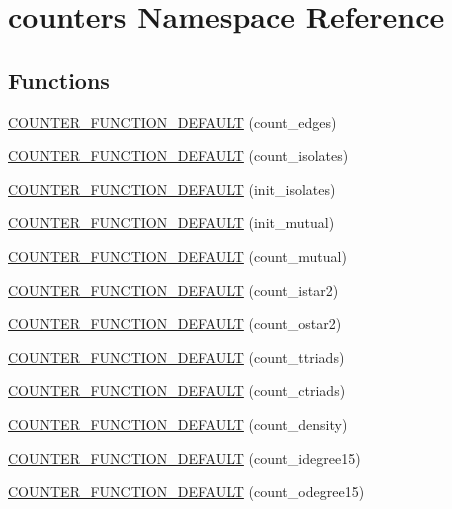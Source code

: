 \hypertarget{namespacecounters}{}\section{counters Namespace Reference}
\label{namespacecounters}
\subsection*{Functions}
\begin{DoxyCompactItemize}
\item 
\hyperlink{namespacecounters_a7e3248247de2a17aac2b02b27f78fa11}{C\+O\+U\+N\+T\+E\+R\+\_\+\+F\+U\+N\+C\+T\+I\+O\+N\+\_\+\+D\+E\+F\+A\+U\+LT} (count\+\_\+edges)
\item 
\hyperlink{namespacecounters_a2bb698ff1178ee5dc760fd9597269ae2}{C\+O\+U\+N\+T\+E\+R\+\_\+\+F\+U\+N\+C\+T\+I\+O\+N\+\_\+\+D\+E\+F\+A\+U\+LT} (count\+\_\+isolates)
\item 
\hyperlink{namespacecounters_a5bbb4b20239df8359834a0bf531045bc}{C\+O\+U\+N\+T\+E\+R\+\_\+\+F\+U\+N\+C\+T\+I\+O\+N\+\_\+\+D\+E\+F\+A\+U\+LT} (init\+\_\+isolates)
\item 
\hyperlink{namespacecounters_a42e9a8748d506b7e8b422c69aa262c2e}{C\+O\+U\+N\+T\+E\+R\+\_\+\+F\+U\+N\+C\+T\+I\+O\+N\+\_\+\+D\+E\+F\+A\+U\+LT} (init\+\_\+mutual)
\item 
\hyperlink{namespacecounters_a7a3094fba5a8576a717e92a223382fa0}{C\+O\+U\+N\+T\+E\+R\+\_\+\+F\+U\+N\+C\+T\+I\+O\+N\+\_\+\+D\+E\+F\+A\+U\+LT} (count\+\_\+mutual)
\item 
\hyperlink{namespacecounters_a1033c77fee688a3604a92e462b0655d0}{C\+O\+U\+N\+T\+E\+R\+\_\+\+F\+U\+N\+C\+T\+I\+O\+N\+\_\+\+D\+E\+F\+A\+U\+LT} (count\+\_\+istar2)
\item 
\hyperlink{namespacecounters_a0a4b15f371d634c31f5d6cdaef01ed69}{C\+O\+U\+N\+T\+E\+R\+\_\+\+F\+U\+N\+C\+T\+I\+O\+N\+\_\+\+D\+E\+F\+A\+U\+LT} (count\+\_\+ostar2)
\item 
\hyperlink{namespacecounters_a367e00a607897c087789480960ded810}{C\+O\+U\+N\+T\+E\+R\+\_\+\+F\+U\+N\+C\+T\+I\+O\+N\+\_\+\+D\+E\+F\+A\+U\+LT} (count\+\_\+ttriads)
\item 
\hyperlink{namespacecounters_abd3f8d1d1b3c02d73890e9d4daebb5e9}{C\+O\+U\+N\+T\+E\+R\+\_\+\+F\+U\+N\+C\+T\+I\+O\+N\+\_\+\+D\+E\+F\+A\+U\+LT} (count\+\_\+ctriads)
\item 
\hyperlink{namespacecounters_ac6ac31529e189df8ed6c948b3dd26c12}{C\+O\+U\+N\+T\+E\+R\+\_\+\+F\+U\+N\+C\+T\+I\+O\+N\+\_\+\+D\+E\+F\+A\+U\+LT} (count\+\_\+density)
\item 
\hyperlink{namespacecounters_a30cd1d5c1060e8097bf7fa69b2c64948}{C\+O\+U\+N\+T\+E\+R\+\_\+\+F\+U\+N\+C\+T\+I\+O\+N\+\_\+\+D\+E\+F\+A\+U\+LT} (count\+\_\+idegree15)
\item 
\hyperlink{namespacecounters_aa3daac49213d1ac56ca65e169f7476d0}{C\+O\+U\+N\+T\+E\+R\+\_\+\+F\+U\+N\+C\+T\+I\+O\+N\+\_\+\+D\+E\+F\+A\+U\+LT} (count\+\_\+odegree15)
\end{DoxyCompactItemize}
